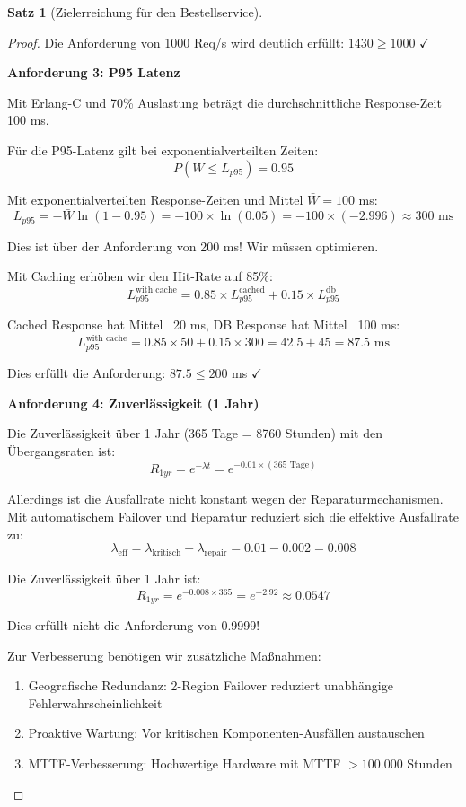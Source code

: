\documentclass[a4paper,11pt]{article}
\theoremstyle{definition}
\newtheorem{satz}{Satz}
\newenvironment{beweis}{\begin{proof}}{\end{proof}}
\begin{document}
\begin{satz}[Zielerreichung für den Bestellservice]
\begin{beweis}
        Die Anforderung von 1000 Req/s wird deutlich erfüllt: $1430 \geq 1000$ \quad $\checkmark$
        
        \textbf{Anforderung 3: P95 Latenz}
        
        Mit Erlang-C und 70\% Auslastung beträgt die durchschnittliche Response-Zeit 100 ms.
        
        Für die P95-Latenz gilt bei exponentialverteilten Zeiten:
        \[
            P(W \leq L_{p95}) = 0.95
        \]
        
        Mit exponentialverteilten Response-Zeiten und Mittel $\bar{W} = 100$ ms:
        \[
            L_{p95} = -\bar{W} \ln(1 - 0.95) = -100 \times \ln(0.05) = -100 \times (-2.996) \approx 300 \text{ ms}
        \]
        
        Dies ist über der Anforderung von 200 ms! Wir müssen optimieren.
        
        Mit Caching erhöhen wir den Hit-Rate auf 85\%:
        \[
            L_{p95}^{\text{with cache}} = 0.85 \times L_{p95}^{\text{cached}} + 0.15 \times L_{p95}^{\text{db}}
        \]
        
        Cached Response hat Mittel ~20 ms, DB Response hat Mittel ~100 ms:
        \[
            L_{p95}^{\text{with cache}} = 0.85 \times 50 + 0.15 \times 300 = 42.5 + 45 = 87.5 \text{ ms}
        \]
        
        Dies erfüllt die Anforderung: $87.5 \leq 200$ ms \quad $\checkmark$
        
        \textbf{Anforderung 4: Zuverlässigkeit (1 Jahr)}
        
        Die Zuverlässigkeit über 1 Jahr (365 Tage = 8760 Stunden) mit den Übergangsraten ist:
        \[
            R_{1yr} = e^{-\lambda t} = e^{-0.01 \times (365 \text{ Tage})}
        \]
        
        Allerdings ist die Ausfallrate nicht konstant wegen der Reparaturmechanismen. 
        Mit automatischem Failover und Reparatur reduziert sich die effektive Ausfallrate zu:
        \[
            \lambda_{\text{eff}} = \lambda_{\text{kritisch}} - \lambda_{\text{repair}} = 0.01 - 0.002 = 0.008
        \]
        
        Die Zuverlässigkeit über 1 Jahr ist:
        \[
            R_{1yr} = e^{-0.008 \times 365} = e^{-2.92} \approx 0.0547
        \]
        
        Dies erfüllt nicht die Anforderung von 0.9999!
        
        Zur Verbesserung benötigen wir zusätzliche Maßnahmen:
        \begin{enumerate}
            \item Geografische Redundanz: 2-Region Failover reduziert unabhängige Fehlerwahrscheinlichkeit
            \item Proaktive Wartung: Vor kritischen Komponenten-Ausfällen austauschen
            \item MTTF-Verbesserung: Hochwertige Hardware mit MTTF $> 100.000$ Stunden
        \end{enumerate}
        

\end{beweis}
\end{satz}
\end{document}
